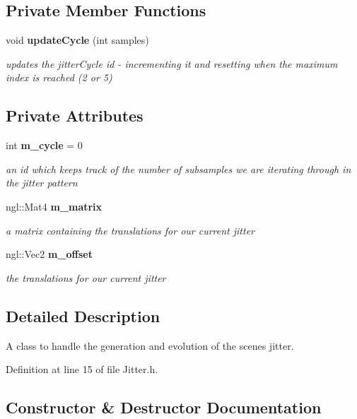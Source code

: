 \subsection*{Private Member Functions}
\begin{DoxyCompactItemize}
\item 
void \textbf{ update\+Cycle} (int samples)
\begin{DoxyCompactList}\small\item\em updates the jitter\+Cycle id -\/ incrementing it and resetting when the maximum index is reached (2 or 5) \end{DoxyCompactList}\end{DoxyCompactItemize}
\subsection*{Private Attributes}
\begin{DoxyCompactItemize}
\item 
int \textbf{ m\+\_\+cycle} = 0
\begin{DoxyCompactList}\small\item\em an id which keeps track of the number of subsamples we are iterating through in the jitter pattern \end{DoxyCompactList}\item 
ngl\+::\+Mat4 \textbf{ m\+\_\+matrix}
\begin{DoxyCompactList}\small\item\em a matrix containing the translations for our current jitter \end{DoxyCompactList}\item 
ngl\+::\+Vec2 \textbf{ m\+\_\+offset}
\begin{DoxyCompactList}\small\item\em the translations for our current jitter \end{DoxyCompactList}\end{DoxyCompactItemize}


\subsection{Detailed Description}
A class to handle the generation and evolution of the scene\textquotesingle{}s jitter. 

Definition at line 15 of file Jitter.\+h.



\subsection{Constructor \& Destructor Documentation}
\mbox{\label{class_jitter_a2421580e189673636b2094096aea272d}} 
